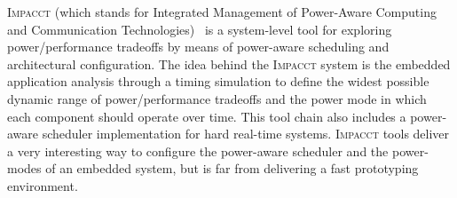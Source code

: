 \textsc{Impacct} (which stands for Integrated Management of
Power-Aware Computing and Communication Technologies)~\cite{Chou:2002}
is a system-level tool for exploring power/performance tradeoffs by
means of power-aware scheduling and architectural configuration. The
idea behind the \textsc{Impacct} system is the embedded application
analysis through a timing simulation to define the widest possible
dynamic range of power/performance tradeoffs and the power mode in
which each component should operate over time. This tool chain also
includes a power-aware scheduler implementation for hard real-time
systems. \textsc{Impacct} tools deliver a very interesting way to
configure the power-aware scheduler and the power-modes of an embedded
system, but is far from delivering a fast prototyping environment.
